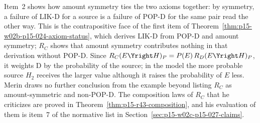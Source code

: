 Item~2 shows how amount symmetry ties the two axioms together: by
symmetry, a failure of LIK-D for a source is a failure of POP-D for the
same pair read the other way. This is the contrapositive face of the
first item of Theorem~\ref{thm:p15-w02b-p15-024-axiom-status}, which
derives LIK-D from POP-D and amount symmetry; \(R_C\) shows that amount
symmetry contributes nothing in that derivation without POP-D. Since
\(R_C(E\Yright H)_P=P(E)\,R_D(E\Yright H)_P\), it weights D by the
probability of the source; in the model the more probable source \(H_2\)
receives the larger value although it raises the probability of \(E\)
less. Merin draws no further conclusion from the example beyond
listing \(R_C\) as amount-symmetric and non-POP-D. The composition laws
of \(R_C\) that he criticizes are proved in
Theorem~\ref{thm:p15-r43-composition}, and his evaluation of them is item~7
of the normative list in Section~\ref{sec:p15-w02c-p15-027-claims}.

